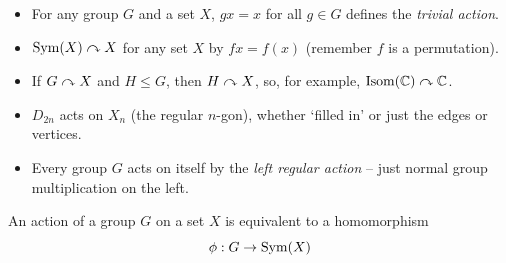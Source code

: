 \documentclass{../../template/note}
\begin{document}
    \begin{example*}
        \begin{itemize}
            \item For any group \(G\) and a set \(X\), \(gx = x\) for all \(g \in G\) defines the \emph{trivial action}.
            \item \(\operatorname{Sym}(X) \curvearrowright X\) for any set \(X\) by \(fx = f(x)\) (remember \(f\) is a permutation).
            \item If \(G \curvearrowright X\) and \(H \leq G\), then \(H \curvearrowright X\), so, for example, \(\operatorname{Isom}(\mathbb C) \curvearrowright \mathbb C\).
            \item \(D_{2n}\) acts on \(X_n\) (the regular \(n\)-gon), whether `filled in' or just the edges or vertices.
            \item Every group \(G\) acts on itself by the \emph{left regular action} -- just normal group multiplication on the left.           
        \end{itemize}
        
        
    \end{example*}
    
    \begin{theorem}
        \label{actions-are-homomorphisms}
        An action of a group \(G\) on a set \(X\) is equivalent to a homomorphism
        \[
            \phi: G \to \operatorname{Sym}(X)
        \]
    \end{theorem}
    
\end{document}
